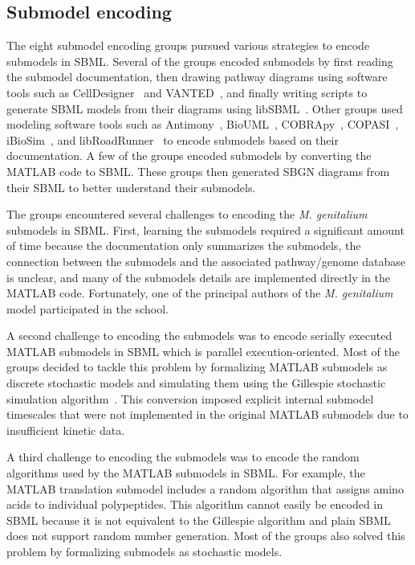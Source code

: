\documentclass[journal,transmag]{IEEEtran}
\begin{document}
\subsection{Submodel encoding}
The eight submodel encoding groups pursued various strategies to encode submodels in SBML. Several of the groups encoded submodels by first reading the submodel documentation, then drawing pathway diagrams using software tools such as CellDesigner~\cite{funahashi2008celldesigner} and VANTED~\cite{Rohn2012}, and finally writing scripts to generate SBML models from their diagrams using libSBML~\cite{bornstein_2008}. Other groups used modeling software tools such as Antimony~\cite{Smith2009}, BioUML~\cite{Kolpakov2006}, COBRApy~\cite{ebrahim2013cobrapy}, COPASI~\cite{Mendes2009}, iBioSim~\cite{Madsen2012}, and libRoadRunner~\cite{Somogyi17062015} to encode submodels based on their documentation. A few of the groups encoded submodels by converting the MATLAB code to SBML. These groups then generated SBGN diagrams from their SBML to better understand their submodels.

The groups encountered several challenges to encoding the \textit{M. genitalium} submodels in SBML. First, learning the submodels required a significant amount of time because the documentation only summarizes the submodels, the connection between the submodels and the associated pathway/genome database is unclear, and many of the submodels details are implemented directly in the MATLAB code. Fortunately, one of the principal authors of the \textit{M. genitalium} model participated in the school.

A second challenge to encoding the submodels was to encode serially executed MATLAB submodels in SBML which is parallel execution-oriented. Most of the groups decided to tackle this problem by formalizing MATLAB submodels as discrete stochastic models and simulating them using the Gillespie stochastic simulation algorithm~\cite{gillespie1977}. This conversion imposed explicit internal submodel timescales that were not implemented in the original MATLAB submodels due to insufficient kinetic data.

A third challenge to encoding the submodels was to encode the random algorithms used by the MATLAB submodels in SBML. For example, the MATLAB translation submodel includes a random algorithm that assigns amino acids to individual polypeptides. This algorithm cannot easily be encoded in SBML because it is not equivalent to the Gillespie algorithm and plain SBML does not support random number generation. Most of the groups also solved this problem by formalizing submodels as stochastic models.
\end{document}
